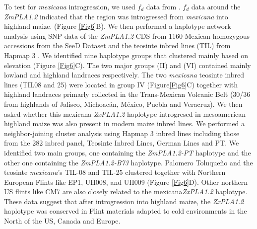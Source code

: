 \documentclass[9pt,twocolumn,twoside,lineno]{BioRxiv}
\begin{document}
To test for \textit{mexicana} introgression, we used \(f_d\) data from \cite{Gonzalez-Segovia2019-jy}.
\(f_d\) data around the \textit{ZmPLA1.2} indicated that the region was introgressed from \textit{mexicana} into highland maize. (Figure \ref{Fig6}B).
We then performed a haplotype network analysis using SNP data of the \textit{ZmPLA1.2} CDS from 1160 Mexican homozygous accessions from the SeeD Dataset \cite{Romero_Navarro2017-cn} and the teosinte inbred lines (TIL) from Hapmap 3 \cite{Bukowski2017-ng}.   
We identified nine haplotype groups that clustered mainly based on elevation (Figure \ref{Fig6}C). 
The two major groups (II) and (VI) contained mainly lowland and highland landraces respectively. 
The two \textit{mexicana} teosinte inbred lines (TIL08 and 25) were located in group IV  (Figure\ref{Fig6}C) together with highland landraces primarly collected in the Trans-Mexican Volcanic Belt (30/36 from highlands of Jalisco, Michoacán, México, Puebla and Veracruz).
We then asked whether this mexicana \textit{ZxPLA1.2} haplotype introgresed in mesoamerican highland maize was also present in modern maize inbred lines. 
We performed a neighbor-joining cluster analysis using Hapmap 3 inbred lines including those from the 282 inbred panel, Teosinte Inbred Lines, German Lines and PT. 
We identified two main groups, one containing the \textit{ZmPLA1.2-PT} haplotype and the other one containing the \textit{ZmPLA1.2-B73} haplotype.
Palomero Toluqueño and the teosinte \textit{mexicana}'s TIL-08 and TIL-25 clustered together with Northern European Flints like EP1, UH008, and UH009 (Figure \ref{Fig6}D). 
Other northern US flints like CM7 are also closely related to the mexicana\textit{ZxPLA1.2} haplotype. 
These data suggest that after introgression into highland maize, the \textit{ZxPLA1.2} haplotype was conserved in Flint materials adapted to cold environments in the North of the US, Canada and Europe. 
\end{document}

